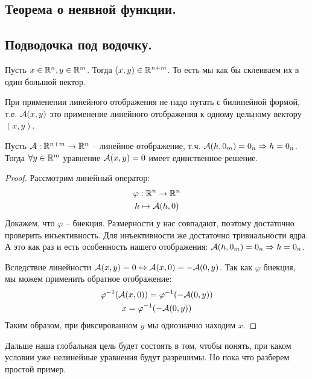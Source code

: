 \subsection{Теорема о неявной функции.}
\subsection*{Подводочка под водочку.}
\begin{conj}
    Пусть $x \in \mathbb{R}^n, y \in \mathbb{R}^m$. 
    Тогда $(x, y) \in \mathbb{R}^{n + m}$.  
    То есть мы как бы склеиваем их в один большой вектор.
\end{conj}

\begin{notice}
    При применении линейного отображения не надо путать с билинейной формой, т.е. $\mathcal{A}(x, y)$ это применение линейного отображения к одному цельному вектору $(x, y)$.
\end{notice}

\begin{lemma}
    Пусть $\mathcal{A} : \mathbb{R}^{n + m} \to \mathbb{R}^n$ -- линейное отображение, т.ч. $\mathcal{A}(h, 0_m) = 0_n \Rightarrow h = 0_n$.
    \\ Тогда $\forall y \in \mathbb{R}^m$ уравнение $\mathcal{A}(x, y) = 0$ имеет единственное решение.
\end{lemma}
\begin{proof}
    Рассмотрим линейный оператор: \begin{gather*}
        \varphi: \mathbb{R}^n \to \mathbb{R}^n \\
        h \mapsto \mathcal{A}(h, 0)
    \end{gather*}
    \quad Докажем, что $\varphi$ -- биекция.
    Размерности у нас совпадают, поэтому достаточно проверить инъективность.
    Для инъективности же достаточно тривиальности ядра. 
    А это как раз и есть особенность нашего отображения: $\mathcal{A}(h, 0_m) = 0_n \Rightarrow h = 0_n$.

    \quad Вследствие линейности $\mathcal{A}(x, y) = 0 \Leftrightarrow \mathcal{A}(x, 0) = -\mathcal{A}(0, y)$.
    Так как $\varphi$ биекция, мы можем применить обратное отображение:
    \begin{gather*} 
        \varphi^{-1}(\mathcal{A}(x, 0)) = \varphi^{-1}(-\mathcal{A}(0, y)) \\
        x = \varphi^{-1}(-\mathcal{A}(0, y))
    \end{gather*}
    \quad Таким образом, при фиксированном $y$ мы однозначно находим $x$.
\end{proof}

Дальше наша глобальная цель будет состоять в том, чтобы понять, при каком условии уже нелинейные уравнения будут разрешимы.
Но пока что разберем простой пример.

